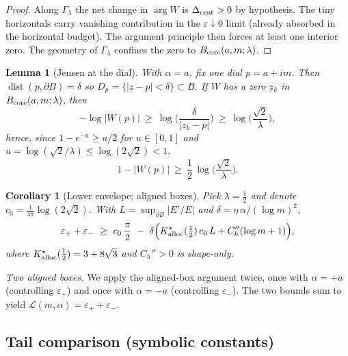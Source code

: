 \documentclass[11pt]{article}
\numberwithin{equation}{section}
\newtheorem{lemma}[theorem]{Lemma}
\newtheorem{corollary}[theorem]{Corollary}
\theoremstyle{remark}
\begin{document}
\begin{proof}
Along $\Gamma_\lambda$ the net change in $\arg W$ is $\Delta_{\rm cent}>0$ by hypothesis. The tiny horizontals carry vanishing contribution in the $\varepsilon\downarrow0$ limit (already absorbed in the horizontal budget). The argument principle then forces at least one interior zero. The geometry of $\Gamma_\lambda$ confines the zero to $B_{\rm core}(a,m;\lambda)$.
\end{proof}

\begin{lemma}[Jensen at the dial]\label{lem:jensen-dial}
With $\alpha=a$, fix one dial $p=a+im$. Then $\operatorname{dist}(p,\partial B)=\delta$ so $D_p=\{|z-p|<\delta\}\subset B$. If $W$ has a zero $z_k$ in $B_{\rm core}(a,m;\lambda)$, then
\[
-\log|W(p)|\ \ge\ \log\!\Big(\frac{\delta}{|z_k-p|}\Big)\ \ge\ \log\!\Big(\frac{\sqrt{2}}{\lambda}\Big),
\]
hence, since $1-e^{-u}\ge u/2$ for $u\in[0,1]$ and $u=\log(\sqrt{2}/\lambda)\le \log(2\sqrt{2})<1$,
\[
1-|W(p)|\ \ge\ \frac{1}{2}\,\log\!\Big(\frac{\sqrt{2}}{\lambda}\Big).
\]
\end{lemma}

\begin{corollary}[Lower envelope; aligned boxes]\label{cor:lower}
Pick $\lambda=\tfrac12$ and denote $c_0=\frac{1}{4\pi}\log(2\sqrt{2})$. With $L=\sup_{\partial B}|E'/E|$ and $\delta=\eta\,\alpha/(\log m)^2$,
\[
\varepsilon_+ + \varepsilon_- \ \ge\ c_0\,\frac{\pi}{2}\ -\ \delta\Big( K_{\rm alloc}^{\star}(\tfrac12)\,c_0\,L + C_h''(\log m+1) \Big),
\]
where $K_{\rm alloc}^{\star}(\tfrac12)=3+8\sqrt{3}$ and $C_h''>0$ is shape-only.
\end{corollary}

\noindent\emph{Two aligned boxes.} We apply the aligned-box argument twice, once with $\alpha=+a$ (controlling $\varepsilon_+$) and once with $\alpha=-a$ (controlling $\varepsilon_-$). The two bounds sum to yield $\mathcal L(m,\alpha)=\varepsilon_+ + \varepsilon_-$.

\subsection{Tail comparison (symbolic constants)}\label{subsec:comparison}
\end{document}
